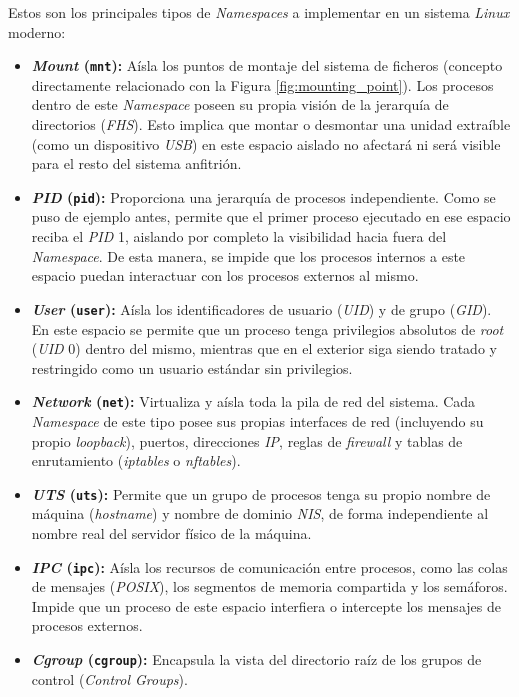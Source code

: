 Estos son los principales tipos de \textit{Namespaces} a implementar en un sistema \textit{Linux} moderno:

\begin{itemize}
    \item \textbf{\textit{Mount} (\texttt{mnt}):} Aísla los puntos de montaje del sistema de ficheros (concepto directamente relacionado con la Figura \ref{fig:mounting_point}). Los procesos dentro de este \textit{Namespace} poseen su propia visión de la jerarquía de directorios (\textit{FHS}).
    Esto implica que montar o desmontar una unidad extraíble (como un dispositivo \textit{USB}) en este espacio aislado no afectará ni será visible para el resto del sistema anfitrión.
    \item \textbf{\textit{PID} (\texttt{pid}):} Proporciona una jerarquía de procesos independiente. Como se puso de ejemplo antes, permite que el primer proceso ejecutado en ese espacio reciba el \textit{PID} 1, 
    aislando por completo la visibilidad hacia fuera del \textit{Namespace}. De esta manera, se impide que los procesos internos a este espacio puedan interactuar con los procesos externos al mismo.
    \item \textbf{\textit{User} (\texttt{user}):} Aísla los identificadores de usuario (\textit{UID}) y de grupo (\textit{GID}).
    En este espacio se permite que un proceso tenga privilegios absolutos de \textit{root} (\textit{UID} 0) dentro del mismo, mientras que en el exterior siga siendo tratado y restringido como un usuario estándar sin privilegios.
    \item \textbf{\textit{Network} (\texttt{net}):} Virtualiza y aísla toda la pila de red del sistema. Cada \textit{Namespace} de este tipo posee sus propias interfaces de red (incluyendo su propio \textit{loopback}),
    puertos, direcciones \textit{IP}, reglas de \textit{firewall} y tablas de enrutamiento (\textit{iptables} o \textit{nftables}).
    \item \textbf{\textit{UTS} (\texttt{uts}):} Permite que un grupo de procesos tenga su propio nombre de máquina (\textit{hostname}) y nombre de dominio \textit{NIS}, de forma independiente al nombre real del servidor físico de la máquina.
    \item \textbf{\textit{IPC} (\texttt{ipc}):} Aísla los recursos de comunicación entre procesos, como las colas de mensajes (\textit{POSIX}), los segmentos de memoria compartida y los semáforos.
    Impide que un proceso de este espacio interfiera o intercepte los mensajes de procesos externos.
    \item \textbf{\textit{Cgroup} (\texttt{cgroup}):} Encapsula la vista del directorio raíz de los grupos de control (\textit{Control Groups}).

\end{itemize}
